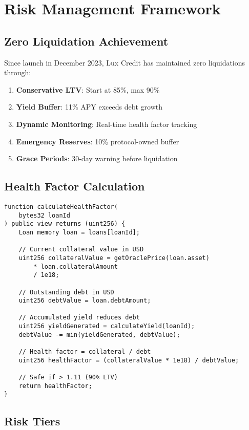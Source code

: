 \documentclass[11pt,a4paper]{article}
\begin{document}
\section{Risk Management Framework}

\subsection{Zero Liquidation Achievement}

Since launch in December 2023, Lux Credit has maintained zero liquidations through:

\begin{enumerate}
\item \textbf{Conservative LTV}: Start at 85\%, max 90\%
\item \textbf{Yield Buffer}: 11\% APY exceeds debt growth
\item \textbf{Dynamic Monitoring}: Real-time health factor tracking
\item \textbf{Emergency Reserves}: 10\% protocol-owned buffer
\item \textbf{Grace Periods}: 30-day warning before liquidation
\end{enumerate}

\subsection{Health Factor Calculation}

\begin{lstlisting}[language=Solidity, basicstyle=\small\ttfamily]
function calculateHealthFactor(
    bytes32 loanId
) public view returns (uint256) {
    Loan memory loan = loans[loanId];
    
    // Current collateral value in USD
    uint256 collateralValue = getOraclePrice(loan.asset) 
        * loan.collateralAmount 
        / 1e18;
    
    // Outstanding debt in USD
    uint256 debtValue = loan.debtAmount;
    
    // Accumulated yield reduces debt
    uint256 yieldGenerated = calculateYield(loanId);
    debtValue -= min(yieldGenerated, debtValue);
    
    // Health factor = collateral / debt
    uint256 healthFactor = (collateralValue * 1e18) / debtValue;
    
    // Safe if > 1.11 (90% LTV)
    return healthFactor;
}
\end{lstlisting}

\subsection{Risk Tiers}
\end{document}

